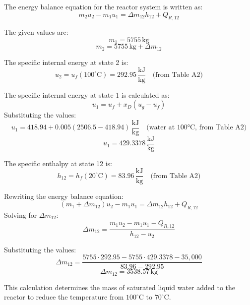 The energy balance equation for the reactor system is written as:  
\[
m_2 u_2 - m_1 u_1 = \Delta m_{12} h_{12} + Q_{R,12}
\]  

The given values are:  
\[
m_1 = 5755 \, \text{kg}
\]  
\[
m_2 = 5755 \, \text{kg} + \Delta m_{12}
\]  

The specific internal energy at state 2 is:  
\[
u_2 = u_{f}(100^\circ\text{C}) = 292.95 \, \frac{\text{kJ}}{\text{kg}} \quad \text{(from Table A2)}
\]  

The specific internal energy at state 1 is calculated as:  
\[
u_1 = u_f + x_D (u_g - u_f)
\]  
Substituting the values:  
\[
u_1 = 418.94 + 0.005 (2506.5 - 418.94) \, \frac{\text{kJ}}{\text{kg}} \quad \text{(water at 100°C, from Table A2)}
\]  
\[
u_1 = 429.3378 \, \frac{\text{kJ}}{\text{kg}}
\]  

The specific enthalpy at state 12 is:  
\[
h_{12} = h_f(20^\circ\text{C}) = 83.96 \, \frac{\text{kJ}}{\text{kg}} \quad \text{(from Table A2)}
\]  

Rewriting the energy balance equation:  
\[
(m_1 + \Delta m_{12}) u_2 - m_1 u_1 = \Delta m_{12} h_{12} + Q_{R,12}
\]  
Solving for \( \Delta m_{12} \):  
\[
\Delta m_{12} = \frac{m_1 u_2 - m_1 u_1 - Q_{R,12}}{h_{12} - u_2}
\]  

Substituting the values:  
\[
\Delta m_{12} = \frac{5755 \cdot 292.95 - 5755 \cdot 429.3378 - 35,000}{83.96 - 292.95}
\]  
\[
\Delta m_{12} = 3538.57 \, \text{kg}
\]  

This calculation determines the mass of saturated liquid water added to the reactor to reduce the temperature from \( 100^\circ\text{C} \) to \( 70^\circ\text{C} \).